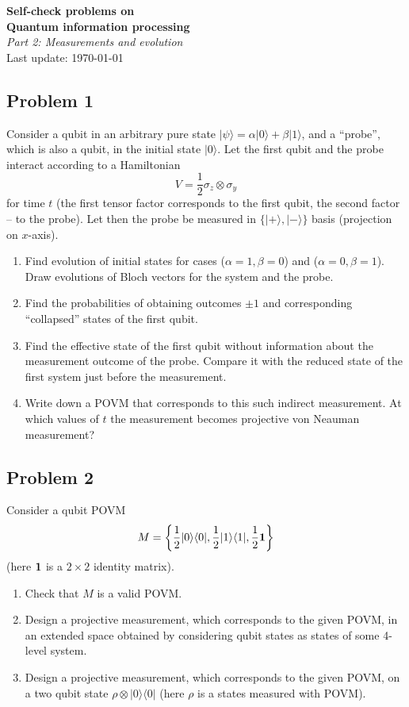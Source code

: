 \documentclass[a4paper,10pt]{article}
\newcommand{\ket}[1]{|#1\rangle}
\newcommand{\bra}[1]{\langle#1|}
\begin{document}
\begin{center}
\Large{{\bf Self-check problems on\\  Quantum information processing}\\{\it Part 2: Measurements and evolution}}\\
\vspace{5pt}
\large{Last update: \today}
\end{center}

\subsection*{Problem 1}
Consider a qubit in an arbitrary pure state $\ket{\psi}=\alpha\ket{0}+\beta\ket{1}$, and a ``probe'', which is also a qubit, in the initial state $\ket{0}$.
Let the first qubit and the probe interact according to a Hamiltonian 
\begin{equation}
	V=\frac{1}{2}\sigma_{z}\otimes\sigma_{y}
\end{equation} 
for time $t$ (the first tensor factor corresponds to the first qubit, the second factor -- to the probe).
Let then the probe be measured in $\{\ket{+}, \ket{-}\}$ basis (projection on $x$-axis).
\begin{enumerate}
	\item Find evolution of initial states for cases ($\alpha=1, \beta=0$) and ($\alpha=0, \beta=1$). 
	Draw evolutions of Bloch vectors for the system and the probe.
	\item Find the probabilities of obtaining outcomes $\pm1$ and corresponding ``collapsed'' states of the first qubit.
	\item Find the effective state of the first qubit without information about the measurement outcome of the probe. Compare it with the reduced state of the first system just before the measurement.
	\item Write down a POVM that corresponds to this such indirect measurement. At which values of $t$ the measurement becomes projective von Neauman measurement?
\end{enumerate}


\subsection*{Problem 2}
Consider a qubit POVM
\begin{equation}
	M = \left\{\frac{1}{2}\ket{0}\bra{0}, \frac{1}{2}\ket{1}\bra{1}, \frac{1}{2}{\bf 1}\right\}
\end{equation}
(here ${\bf 1}$ is a $2\times 2$ identity matrix).
\begin{enumerate}
	\item Check that $M$ is a valid POVM.
	\item Design a projective measurement, which corresponds to the given POVM, in an extended space obtained by considering qubit states as states of some 4-level system. 
	\item Design a projective measurement, which corresponds to the given POVM, on a two qubit state $\rho\otimes\ket{0}\bra{0}$ (here $\rho$ is a states measured with POVM).
\end{enumerate}
\end{document}
